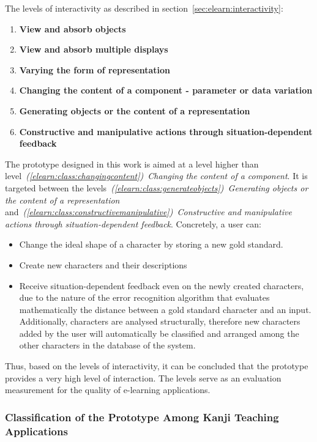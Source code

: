 \noindent The levels of interactivity as described in 
section~\ref{sec:elearn:interactivity}:
\begin{enumerate}
\item \textbf{View and absorb objects} 
\item \textbf{View and absorb multiple displays} 
\item \textbf{Varying the form of representation} 
\item \textbf{Changing the content of a component - parameter or data variation}
\item \textbf{Generating objects or the content of a representation} 
\item \textbf{Constructive and manipulative actions through situation-dependent feedback}
\end{enumerate}
The prototype designed in this work is aimed at a level higher than 
level~\emph{(\ref{elearn:class:changingcontent})~Changing the content of a 
component}. It is targeted between the 
levels~\emph{(\ref{elearn:class:generateobjects})~Generating objects or 
the content of a representation} 
and~\emph{(\ref{elearn:class:constructivemanipulative})~Constructive and 
manipulative actions through situation-dependent feedback}.
Concretely, a user can:
\begin{itemize}
 \item Change the ideal shape of a character by storing a new gold standard.
 \item Create new characters and their descriptions
 \item Receive situation-dependent feedback even on the newly created characters,
       due to the nature of the error recognition algorithm that evaluates
       mathematically the distance between a gold standard character and
       an input.
       Additionally, characters are analysed structurally, therefore new 
       characters added by the user will automatically be classified and arranged
       among the other characters in the database of the system.
\end{itemize}
Thus, based on the levels of interactivity,
it can be concluded that the prototype provides a very high level of 
interaction. The levels serve as an evaluation measurement for the quality of 
e-learning applications.

\subsubsection[Classification of the Prototype]
{Classification of the Prototype Among Kanji Teaching Applications}
\label{sec:concept:classificationofkanjicoach}

